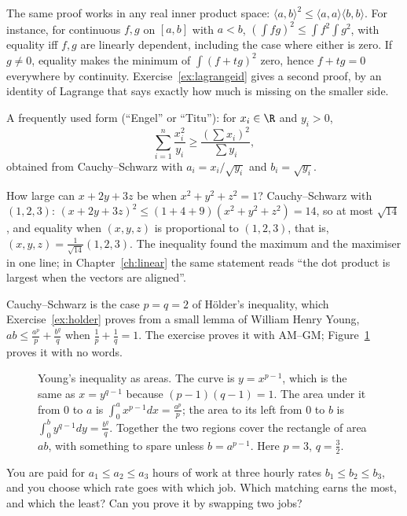 The same proof works in any real inner product space: $\langle a,b\rangle^2\le\langle a,a\rangle\langle b,b\rangle$. For instance, for continuous $f,g$ on $[a,b]$ with $a<b$, $\left(\int fg\right)^2\le\int f^2\int g^2$, with equality iff $f,g$ are linearly dependent, including the case where either is zero. If $g\ne0$, equality makes the minimum of $\int(f+tg)^2$ zero, hence $f+tg=0$ everywhere by continuity.
Exercise~\ref{ex:lagrangeid} gives a second proof, by an identity of Lagrange that says exactly how much is missing on the smaller side.

A frequently used form (``Engel'' or ``Titu''): for $x_i\in\R$ and $y_i>0$,
\[
\sum_{i=1}^n\frac{x_i^2}{y_i}\ge\frac{\left(\sum x_i\right)^2}{\sum y_i},
\]
obtained from Cauchy--Schwarz with $a_i=x_i/\sqrt{y_i}$ and $b_i=\sqrt{y_i}$.

\begin{examplex}
How large can $x+2y+3z$ be when $x^2+y^2+z^2=1$? Cauchy--Schwarz with $(1,2,3)$: $(x+2y+3z)^2\le(1+4+9)(x^2+y^2+z^2)=14$, so at most $\sqrt{14}$,
and equality when $(x,y,z)$ is proportional to $(1,2,3)$, that is, $(x,y,z)=\frac1{\sqrt{14}}(1,2,3)$. The inequality found the maximum and the
maximiser in one line; in Chapter~\ref{ch:linear} the same statement reads ``the dot product is largest when the vectors are aligned''.
\end{examplex}

Cauchy--Schwarz is the case $p=q=2$ of H\"older's inequality, which Exercise~\ref{ex:holder} proves from a small lemma of William Henry Young,
$ab\le\frac{a^p}p+\frac{b^q}q$ when $\frac1p+\frac1q=1$. The exercise proves it with AM--GM; Figure~\ref{fig:young} proves it with no words.

\begin{figure}[ht]
\centering
{}
\caption{Young's inequality as areas. The curve is $y=x^{p-1}$, which is the same as $x=y^{q-1}$ because $(p-1)(q-1)=1$. The area under it from $0$ to $a$ is $\int_0^ax^{p-1}dx=\frac{a^p}p$; the area to its left from $0$ to $b$ is $\int_0^by^{q-1}dy=\frac{b^q}q$. Together the two regions cover the rectangle of area $ab$, with something to spare unless $b=a^{p-1}$. Here $p=3$, $q=\frac32$.}
\label{fig:young}
\end{figure}

\begin{think}
You are paid for $a_1\le a_2\le a_3$ hours of work at three hourly rates $b_1\le b_2\le b_3$, and you choose which rate goes with which job. Which matching earns the most, and which the least? Can you prove it by swapping two jobs?
\end{think}

